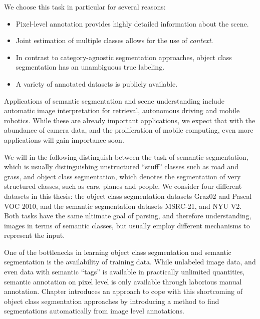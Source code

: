 We choose this task in particular for several reasons:
\begin{itemize}
    \item Pixel-level annotation provides highly detailed information about the scene.
    \item Joint estimation of multiple classes allows for the use of \emph{context}.
    \item In contrast to category-agnostic segmentation approaches, object class segmentation
        has an unambiguous true labeling.
    \item A variety of annotated datasets is publicly available.
\end{itemize}
%
Applications of semantic segmentation and scene understanding include automatic
image interpretation for retrieval, autonomous driving and mobile robotics.
While these are already important applications, we expect that with the
abundance of camera data, and the proliferation of mobile computing, even
more applications will gain importance soon.

We will in the following distinguish between the task of semantic segmentation,
which is usually distinguishing unstructured ``stuff'' classes such as road and
grass, and object class segmentation, which denotes the segmentation of very
structured classes, such as cars, planes and people.
We consider four different datasets in this thesis: the object class segmentation
datasets Graz02 and Pascal VOC 2010, and the semantic segmentation datasets MSRC-21,
and NYU V2.
%
Both tasks have the same ultimate goal of parsing, and therefore understanding, images
in terms of semantic classes, but usually employ  different mechanisms to represent the input.

One of the bottlenecks in learning object class segmentation and semantic
segmentation is the availability of training data.  While unlabeled image data,
and even data with semantic
``tags'' is available in practically unlimited quantities, semantic annotation
on pixel level is only available through laborious manual annotation. 
Chapter %
introduces an approach to cope with this shortcoming of object class segmentation approaches
by introducing a method to find segmentations automatically from image level annotations.

